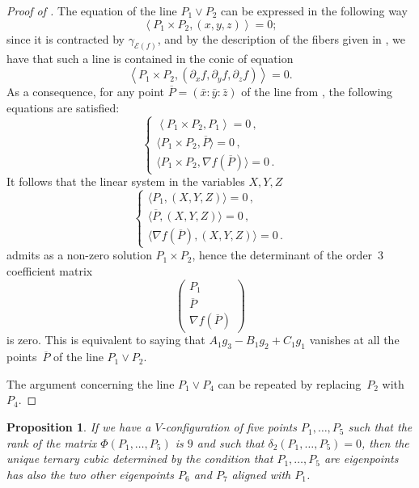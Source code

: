 \documentclass{amsart}
\theoremstyle{plain}
\newtheorem{prop}[lemma]{Proposition}
\theoremstyle{definition}
\newcommand{\de}{\partial}
\newcommand{\Eig}[1]{\mathcal{E}\!\left( {#1} \right)}
\begin{document}
\begin{proof}[Proof of ]
The equation of the line $P_1 \vee P_2$ can be expressed in the following way
%
\begin{equation}
\label{eq:lineP1P2}
  \left\langle P_1 \times P_2, (x,y,z) \right\rangle = 0;
\end{equation}
%
since it is contracted by $\gamma_{\Eig{f}}$, and by the description of the fibers given in , we have that such a line is contained in the conic of equation
%
\[
  \left\langle P_1 \times P_2, (\de_x f, \de_y f, \de_z f) \right\rangle = 0.
\]
%
As a consequence, for any point $\overline{P} = (\bar x: \bar y: \bar z)$ of the line from , the following equations are satisfied:
%
\[
\left\{
\begin{array}{l}
  \left\langle P_1 \times P_2, P_1 \right\rangle = 0 \,,\\[2pt]
  \bigl\langle P_1 \times P_2, \overline{P} \bigr\rangle = 0 \,,\\[2pt]
  \bigl\langle P_1 \times P_2, \nabla f (\overline{P}) \bigr\rangle = 0 \,.
\end{array}
\right.
\]
%
It follows that the linear system in the variables $X,Y,Z$
%
\[
\left\{
\begin{array}{l}
  \bigl\langle P_1, (X,Y,Z) \bigr\rangle = 0 \,,\\[2pt]
  \bigl\langle \overline{P}, (X,Y,Z) \bigr\rangle = 0 \,,\\[2pt]
  \bigl\langle \nabla f (\overline{P}),
  (X,Y,Z) \bigr\rangle = 0 \,.
\end{array}
\right.
\]
%
admits as a non-zero solution $P_1 \times P_2$,
hence the determinant of the order~$3$ coefficient matrix
%
\[
 \left(
 \begin{array}{c}
  P_1 \\
  \overline{P} \\
  \nabla f (\overline{P})
 \end{array}
 \right)
\]
%
is zero. This is equivalent to saying that $A_1 g_3 - B_1 g_2 +C_1 g_1$ vanishes at all the points~$\overline{P}$ of the line $P_1 \vee P_2$.

The argument concerning the line $P_1 \vee P_4$ can be repeated by replacing~$P_2$ with~$P_4$.
\end{proof}
%
\begin{prop}
\label{proposition:third_alignment}
If we have a $V$-configuration of five points $P_1, \dots, P_5$
such that the rank of the matrix $\Phi(P_1, \dots, P_5)$ is $9$ and
such that $\delta_2(P_1, \dots, P_5) = 0$,
then the unique ternary cubic determined by the condition that $P_1, \dots, P_5$
are eigenpoints has also the two other eigenpoints $P_6$ and $P_7$
aligned with $P_1$.
\end{prop}
\end{document}
